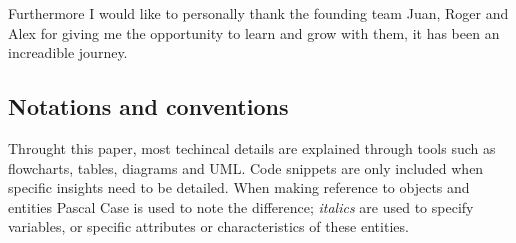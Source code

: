 Furthermore I would like to personally thank the founding team Juan, Roger and Alex for giving me the opportunity to learn and grow with them, it has been an increadible journey.

\subsection*{Notations and conventions}

Throught this paper, most techincal details are explained through tools such as flowcharts, tables, diagrams and UML. Code snippets are only included when specific insights need to be detailed. When making reference to objects and entities Pascal Case is used to note the difference; \textit{italics} are used to specify variables, or specific attributes or characteristics of these entities.

